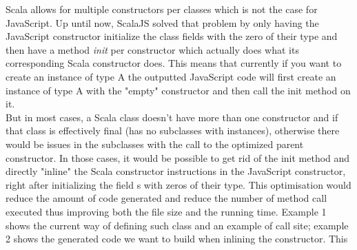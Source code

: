 Scala allows for multiple constructors per classes which is not the case for JavaScript.
Up until now, ScalaJS solved that problem by only having the JavaScript constructor initialize the class fields with the zero of their type and then have a method \emph{init} per constructor which actually does what its corresponding Scala constructor does. This means that currently if you want to create an instance of type A the outputted JavaScript code will first create an instance of type A with the "empty" constructor and then call the init method on it. \\
But in most cases, a Scala class doesn't have more than one constructor and if that class is effectively final (has no subclasses with instances), otherwise there would be issues in the subclasses with the call to the optimized parent constructor. In those cases, it would be possible to get rid of the init method and directly "inline" the Scala constructor instructions in the JavaScript constructor, right after initializing the field s with zeros of their type. This optimisation would reduce the amount of code generated and reduce the number of method call executed thus improving both the file size and the running time. Example 1 shows the current way of defining such class and an example of call site; example 2 shows the generated code we want to build when inlining the constructor.
This 
